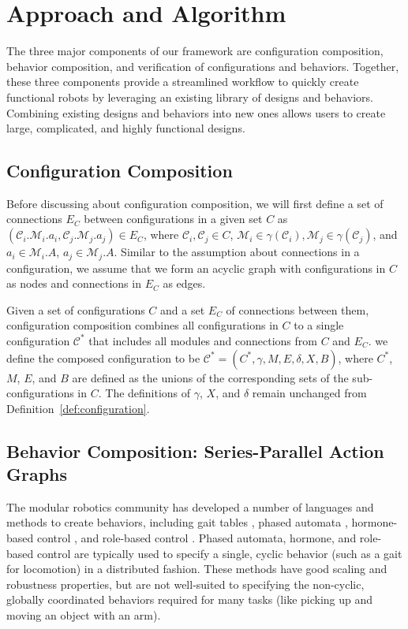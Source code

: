 \documentclass[graybox]{svmult}
\begin{document}
\section{Approach and Algorithm} \label{sec:approach} The three major
components of our framework are configuration composition, behavior
composition, and verification of configurations and behaviors.  Together,
these three components provide a streamlined workflow to quickly create
functional robots by leveraging an existing library of designs and behaviors.
Combining existing designs and behaviors into new ones allows users to create
large, complicated, and highly functional designs.

\subsection{Configuration Composition} \label{sec:conf_composition}

Before discussing about configuration composition, we will first define a set of connections $E_C$ between configurations in a given set $C$ as $(\mathcal{C}_i.\mathcal{M}_i.a_i, \mathcal{C}_j.\mathcal{M}_j.a_j) \in E_C$, where $\mathcal{C}_{i},\mathcal{C}_j\in C$, $\mathcal{M}_i \in \gamma(\mathcal{C}_i), \mathcal{M}_j \in \gamma(\mathcal{C}_j)$, and $a_i\in \mathcal{M}_i.A$, $a_j\in \mathcal{M}_j.A$. Similar to the assumption about connections in a configuration, we assume that we form an
acyclic graph with configurations in $C$ as nodes and connections in $E_C$ as edges.
\begin{definition}
Given a set of configurations $C$ and a set $E_C$ of connections between them,
configuration composition combines all configurations in $C$ to a single
configuration $\mathcal{C}^*$ that includes all modules and connections from $C$
and $E_C$. we define the composed configuration to be $\mathcal{C}^*=(C^*, \gamma, M, E, \delta,
X, B)$, where \(C^*\), \(M\), \(E\), and \(B\) are defined as the unions of the
corresponding sets of the sub-configurations in \(C\). The definitions of $\gamma$, \(X\), and $\delta$ remain
unchanged from Definition~\ref{def:configuration}. 
\end{definition}

\subsection{Behavior Composition: Series-Parallel Action Graphs}
\label{sec:behavior-representation}
The modular robotics community has developed a number of languages and  methods
to create behaviors, including gait tables \cite{yim1994locomotion}, phased automata
\cite{zhang2003phase}, hormone-based control \cite{salemi2001hormone},
and role-based control \cite{stoy2002using}. Phased automata, hormone, and role-based
control are typically used to specify a single, cyclic behavior (such as a gait for
locomotion) in a distributed fashion.
These methods have good scaling and robustness properties, but are not well-suited
to specifying  the non-cyclic, globally coordinated behaviors required for many tasks
(like picking up and moving an object with an arm).
  
\end{document}
